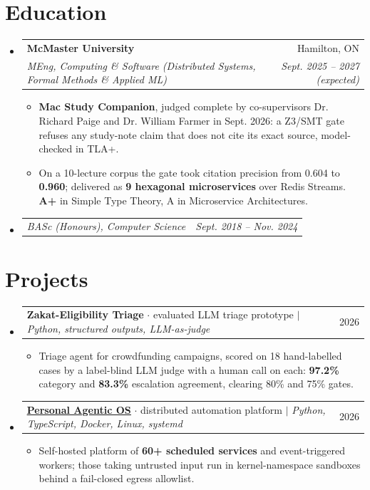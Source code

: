 \documentclass[letterpaper,11pt]{article}
\makeatletter
\newcommand{\resumeItem}[1]{
  \item\small{
    {#1\vspace{-2pt}}
  }
}
\newcommand{\resumeSubheading}[4]{
  \vspace{-2pt}\item
    \begin{tabular*}{0.97\textwidth}[t]{l@{\extracolsep{\fill}}r}
      \textbf{#1} & #2 \\
      \textit{\small#3} & \textit{\small #4} \\
    \end{tabular*}\vspace{-7pt}
}
\newcommand{\resumeSubSubheading}[2]{
    \item
    \begin{tabular*}{0.97\textwidth}{l@{\extracolsep{\fill}}r}
      \textit{\small#1} & \textit{\small #2} \\
    \end{tabular*}\vspace{-7pt}
}
\newcommand{\resumeProjectHeading}[2]{
    \item
    \begin{tabular*}{0.97\textwidth}{l@{\extracolsep{\fill}}r}
      \small#1 & #2 \\
    \end{tabular*}\vspace{-7pt}
}
\newcommand{\resumeSubHeadingListStart}{\begin{itemize}[leftmargin=0.15in, label={}]}
\newcommand{\resumeSubHeadingListEnd}{\end{itemize}}
\newcommand{\resumeItemListStart}{\begin{itemize}}
\newcommand{\resumeItemListEnd}{\end{itemize}\vspace{-5pt}}
\makeatother
\begin{document}
\section{Education}
  \resumeSubHeadingListStart
    \resumeSubheading
      {McMaster University}{Hamilton, ON}
      {MEng, Computing \& Software (Distributed Systems, Formal Methods \& Applied ML)}{Sept. 2025 -- 2027 (expected)}
      \resumeItemListStart
        \resumeItem{\textbf{Mac Study Companion}, judged complete by co-supervisors Dr. Richard Paige and Dr. William Farmer in Sept. 2026: a Z3/SMT gate refuses any study-note claim that does not cite its exact source, model-checked in TLA+.}
        \resumeItem{On a 10-lecture corpus the gate took citation precision from 0.604 to \textbf{0.960}; delivered as \textbf{9 hexagonal microservices} over Redis Streams. \textbf{A+} in Simple Type Theory, A in Microservice Architectures.}
      \resumeItemListEnd
    \resumeSubSubheading
      {BASc (Honours), Computer Science}{Sept. 2018 -- Nov. 2024}
  \resumeSubHeadingListEnd

\section{Projects}
    \resumeSubHeadingListStart
      \resumeProjectHeading
          {\textbf{Zakat-Eligibility Triage} $\cdot$ evaluated LLM triage prototype $|$ \emph{Python, structured outputs, LLM-as-judge}}{2026}
          \resumeItemListStart
            \resumeItem{Triage agent for crowdfunding campaigns, scored on 18 hand-labelled cases by a label-blind LLM judge with a human call on each: \textbf{97.2\%} category and \textbf{83.3\%} escalation agreement, clearing 80\% and 75\% gates.}
          \resumeItemListEnd
      \resumeProjectHeading
          {\href{https://www.suleyman.io/architecture}{\underline{\textbf{Personal Agentic OS}}} $\cdot$ distributed automation platform $|$ \emph{Python, TypeScript, Docker, Linux, systemd}}{2026}
          \resumeItemListStart
            \resumeItem{Self-hosted platform of \textbf{60+ scheduled services} and event-triggered workers; those taking untrusted input run in kernel-namespace sandboxes behind a fail-closed egress allowlist.}
          \resumeItemListEnd
    \resumeSubHeadingListEnd
\end{document}
